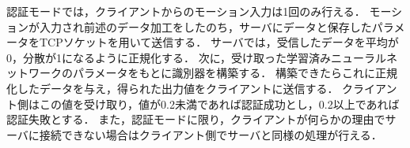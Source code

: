 認証モードでは，クライアントからのモーション入力は1回のみ行える．
モーションが入力され前述のデータ加工をしたのち，サーバにデータと保存したパラメータをTCPソケットを用いて送信する．
サーバでは，受信したデータを平均が0，分散が1になるように正規化する．
次に，受け取った学習済みニューラルネットワークのパラメータをもとに識別器を構築する．
構築できたらこれに正規化したデータを与え，得られた出力値をクライアントに送信する．
クライアント側はこの値を受け取り，値が0.2未満であれば認証成功とし，0.2以上であれば認証失敗とする．
また，認証モードに限り，クライアントが何らかの理由でサーバに接続できない場合はクライアント側でサーバと同様の処理が行える．
